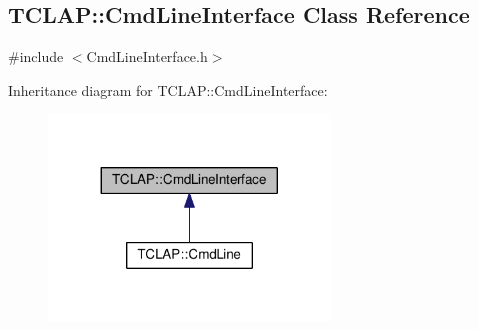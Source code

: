 \hypertarget{classTCLAP_1_1CmdLineInterface}{}\subsection{T\+C\+L\+AP\+:\+:Cmd\+Line\+Interface Class Reference}
\label{classTCLAP_1_1CmdLineInterface}


{\ttfamily \#include $<$Cmd\+Line\+Interface.\+h$>$}



Inheritance diagram for T\+C\+L\+AP\+:\+:Cmd\+Line\+Interface\+:
\nopagebreak
\begin{figure}[H]
\begin{center}
\leavevmode
\includegraphics[width=212pt]{classTCLAP_1_1CmdLineInterface__inherit__graph}
\end{center}
\end{figure}
